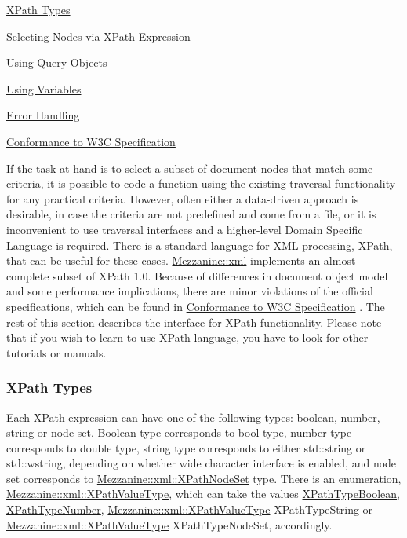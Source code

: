 \begin{DoxyItemize}
\item \hyperlink{XMLManual_XMLXPathTypes}{XPath Types}
\item \hyperlink{XMLManual_XMLXPathSelecting}{Selecting Nodes via XPath Expression}
\item \hyperlink{XMLManual_XMLXPathQuery}{Using Query Objects}
\item \hyperlink{XMLManual_XMLXPathVariables}{Using Variables}
\item \hyperlink{XMLManual_XMLXPathError}{Error Handling}
\item \hyperlink{XMLManual_XMLXPathStandards}{Conformance to W3C Specification}
\end{DoxyItemize}

If the task at hand is to select a subset of document nodes that match some criteria, it is possible to code a function using the existing traversal functionality for any practical criteria. However, often either a data-\/driven approach is desirable, in case the criteria are not predefined and come from a file, or it is inconvenient to use traversal interfaces and a higher-\/level Domain Specific Language is required. There is a standard language for XML processing, XPath, that can be useful for these cases. \hyperlink{namespaceMezzanine_1_1xml}{Mezzanine::xml} implements an almost complete subset of XPath 1.0. Because of differences in document object model and some performance implications, there are minor violations of the official specifications, which can be found in \hyperlink{XMLManual_XMLXPathStandards}{Conformance to W3C Specification} . The rest of this section describes the interface for XPath functionality. Please note that if you wish to learn to use XPath language, you have to look for other tutorials or manuals. \par
 \par
 \hypertarget{XMLManual_XMLXPathTypes}{}\subsubsection{XPath Types}\label{XMLManual_XMLXPathTypes}
Each XPath expression can have one of the following types: boolean, number, string or node set. Boolean type corresponds to bool type, number type corresponds to double type, string type corresponds to either std::string or std::wstring, depending on whether wide character interface is enabled, and node set corresponds to \hyperlink{classMezzanine_1_1xml_1_1XPathNodeSet}{Mezzanine::xml::XPathNodeSet} type. There is an enumeration, \hyperlink{namespaceMezzanine_1_1xml_aca3f7ad3597c316e5ee6c216e126e7b0}{Mezzanine::xml::XPathValueType}, which can take the values \hyperlink{namespaceMezzanine_1_1xml_aca3f7ad3597c316e5ee6c216e126e7b0}{XPathTypeBoolean}, \hyperlink{namespaceMezzanine_1_1xml_aca3f7ad3597c316e5ee6c216e126e7b0}{XPathTypeNumber}, \hyperlink{namespaceMezzanine_1_1xml_aca3f7ad3597c316e5ee6c216e126e7b0}{Mezzanine::xml::XPathValueType} XPathTypeString or \hyperlink{namespaceMezzanine_1_1xml_aca3f7ad3597c316e5ee6c216e126e7b0}{Mezzanine::xml::XPathValueType} XPathTypeNodeSet, accordingly. \par
